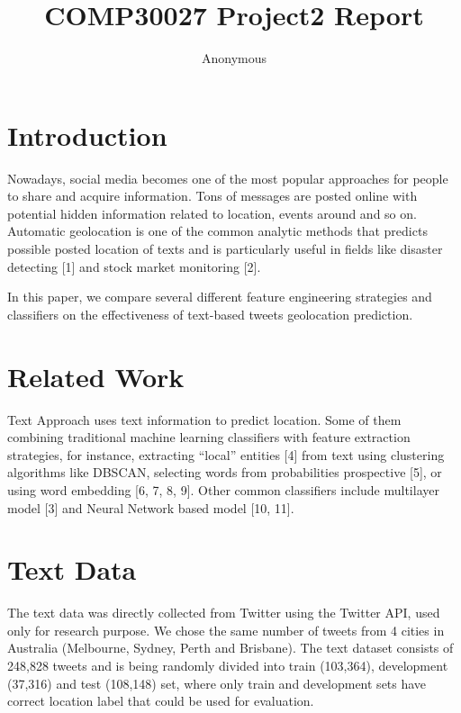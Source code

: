 \documentclass[11pt]{article}
\title{COMP30027 Project2 Report}
\author
{Anonymous}
\begin{document}
\maketitle


\section{Introduction}

Nowadays, social media becomes one of the most popular approaches for people to share and acquire information. Tons of messages are posted online with potential hidden information related to location, events around and so on. Automatic geolocation is one of the common analytic methods that predicts possible posted location of texts and is particularly useful in fields like disaster detecting [1] and stock market monitoring [2].

In this paper, we compare several different feature engineering strategies and classifiers on the effectiveness of text-based tweets geolocation prediction.

\section{Related Work}

Text Approach uses text information to predict location. Some of them combining traditional machine learning classifiers with feature extraction strategies, for instance, extracting “local” entities [4] from text using clustering algorithms like DBSCAN, selecting words from probabilities prospective [5], or using word embedding [6, 7, 8, 9]. Other common classifiers include multilayer model [3] and Neural Network based model [10, 11].

\section{Text Data}

The text data was directly collected from Twitter using the Twitter API, used only for research purpose. We chose the same number of tweets from 4 cities in Australia (Melbourne, Sydney, Perth and Brisbane). The text dataset consists of 248,828 tweets and is being randomly divided into train (103,364), development (37,316) and test (108,148) set, where only train and development sets have correct location label that could be used for evaluation. 
\end{document}

